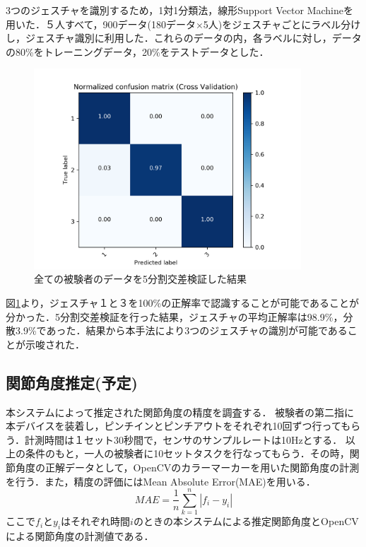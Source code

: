 \documentclass[11pt,a4paper]{jarticle}
\begin{document}
3つのジェスチャを識別するため，1対1分類法，線形Support Vector Machineを用いた．５人すべて，900データ(180データ$\times$5人)をジェスチャごとにラベル分けし，ジェスチャ識別に利用した．これらのデータの内，各ラベルに対し，データの80\%をトレーニングデータ，20\%をテストデータとした．

\begin{figure}[H]
\begin{center}
\includegraphics[width=10cm]{fig/confusion_matrix.png}
\caption{全ての被験者のデータを5分割交差検証した結果}
\label{matrix}
\end{center}
\end{figure}


図\ref{matrix}より，ジェスチャ１と３を100\%の正解率で認識することが可能であることが分かった．5分割交差検証を行った結果，ジェスチャの平均正解率は98.9\%，分散3.9\%であった．結果から本手法により3つのジェスチャの識別が可能であることが示唆された．

\subsection{関節角度推定(予定)}
本システムによって推定された関節角度の精度を調査する．
被験者の第二指に本デバイスを装着し，ピンチインとピンチアウトをそれぞれ10回ずつ行ってもらう．計測時間は１セット30秒間で，センサのサンプルレートは10Hzとする．
以上の条件のもと，一人の被験者に10セットタスクを行なってもらう．その時，関節角度の正解データとして，OpenCVのカラーマーカーを用いた関節角度の計測を行う．また，精度の評価にはMean Absolute Error(MAE)を用いる．
\begin{equation}
MAE = \frac{1}{n} \sum^n_{k=1} |f_i-y_i|
\end{equation}
ここで$f_i$と$y_i$はそれぞれ時間$i$のときの本システムによる推定関節角度とOpenCVによる関節角度の計測値である．
\end{document}
